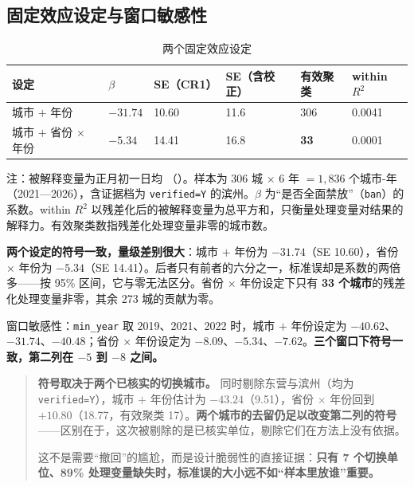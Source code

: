 \subsection{固定效应设定与窗口敏感性}\label{sec:fe}

\begin{table}[H]
\centering
\caption{两个固定效应设定}
\label{tab:fe}
\small
\begin{tabular}{L{3.8cm}R{1.8cm}R{1.9cm}R{2.0cm}R{1.8cm}R{1.9cm}}
\toprule
\textbf{设定} & $\beta$ & \textbf{SE（CR1）} & \textbf{SE（含校正）} & \textbf{有效聚类} & \textbf{within $R^2$} \\
\midrule
城市 $+$ 年份 & $-31.74$ & 10.60 & 11.6 & 306 & 0.0041 \\
城市 $+$ 省份 $\times$ 年份 & $-5.34$ & 14.41 & 16.8 & \textbf{33} & 0.0001 \\
\bottomrule
\end{tabular}

\vspace{0.3em}
{\small 注：被解释变量为正月初一日均 （\ugm）。样本为 306 城 $\times$ 6 年 $=1{,}836$ 个城市-年（2021—2026），含证据档为 \texttt{verified=Y} 的滨州。$\beta$ 为“是否全面禁放”（\texttt{ban}）的系数。within $R^2$ 以残差化后的被解释变量为总平方和，只衡量处理变量对结果的解释力。有效聚类数指残差化处理变量非零的城市数。}
\end{table}

\textbf{两个设定的符号一致，量级差别很大}：城市 $+$ 年份为 $-31.74$（SE 10.60），省份 $\times$ 年份为 $-5.34$（SE 14.41）。后者只有前者的六分之一，标准误却是系数的两倍多——按 95\% 区间，它与零无法区分。省份 $\times$ 年份设定下只有 \textbf{33 个城市}的残差化处理变量非零，其余 273 城的贡献为零。

窗口敏感性：\texttt{min\_year} 取 2019、2021、2022 时，城市 $+$ 年份设定为 $-40.62$、$-31.74$、$-40.48$；省份 $\times$ 年份设定为 $-8.09$、$-5.34$、$-7.62$。\textbf{三个窗口下符号一致，第二列在 $-5$ 到 $-8$ 之间。}

\begin{quote}
\textbf{符号取决于两个已核实的切换城市。} 同时剔除东营与滨州（均为 \texttt{verified=Y}），城市 $+$ 年份估计为 $-43.24$（9.51），省份 $\times$ 年份回到 $+10.80$（18.77，有效聚类 17）。\textbf{两个城市的去留仍足以改变第二列的符号}——区别在于，这次被剔除的是已核实单位，剔除它们在方法上没有依据。

这不是需要“撤回”的尴尬，而是设计脆弱性的直接证据：\textbf{只有 7 个切换单位、89\% 处理变量缺失时，标准误的大小远不如“样本里放谁”重要。}
\end{quote}

